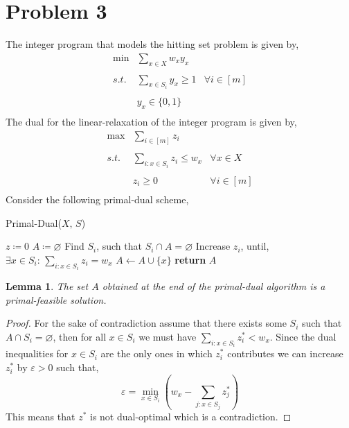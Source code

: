 \documentclass{article}
\numberwithin{equation}{section}
\newtheorem{lemma}{Lemma}
\numberwithin{theorem}{section}
\numberwithin{lemma}{section}
\newcommand{\roundBrace}[1]{\left(#1\right)}
\begin{document}
\section{Problem 3}
The integer program that models the hitting set problem is given by, 
\begin{equation}
    \begin{array}{ccc}
        \min& \sum_{x\in X} w_x y_x&  \\\\
        s.t.& \sum_{x\in S_i} y_x \ge 1&\forall i \in [m]\\\\
        &y_x \in \{0, 1\}& \\
    \end{array}
\end{equation}
The dual for the linear-relaxation of the integer program is given by, 
\begin{equation}
    \begin{array}{ccc}
        \max& \sum_{i\in [m]} z_i&  \\\\
        s.t.& \sum_{i:x\in S_i} z_i \le w_x&\forall x\in X\\\\
        &z_i \ge 0& \forall i\in [m]\\
    \end{array}
\end{equation}
Consider the following primal-dual scheme, 
\begin{algorithm}[H]
    \caption{Primal-Dual($X,\, S$)}
    \begin{algorithmic}[1]
        \State $z\coloneqq 0$
        \State $A\coloneqq \varnothing$
            \State Find $S_i$, such that $S_i \cap A = \varnothing$
            \State Increase $z_i$, until, $\exists x\in S_i : \, \sum_{i:x\in S_i} z_i = w_x$
            \State$ A\leftarrow A\cup \{x\}$
        \EndWhile
        \State \textbf{return} $A$
    \end{algorithmic}
\end{algorithm}
\begin{lemma}
    The set $A$ obtained at the end of the primal-dual algorithm is a primal-feasible solution. 
\end{lemma}
\begin{proof}
    For the sake of contradiction assume that there exists some $S_i$ such that $A \cap S_i = \varnothing$, then for all $x \in S_i$ we must have $\sum_{i:x\in S_i} z_i^* < w_x$. Since the dual inequalities for $x \in S_i$ are the only ones in which $z_i^*$ contributes we can increase $z^*_i$ by $\varepsilon > 0$ such that, 
    \begin{equation}
        \varepsilon = \min_{x\in S_i} \roundBrace{w_x - \sum_{j:x\in S_j}z^*_j}
    \end{equation}
    This means that $z^*$ is not dual-optimal which is a contradiction. 
\end{proof}
\end{document}
